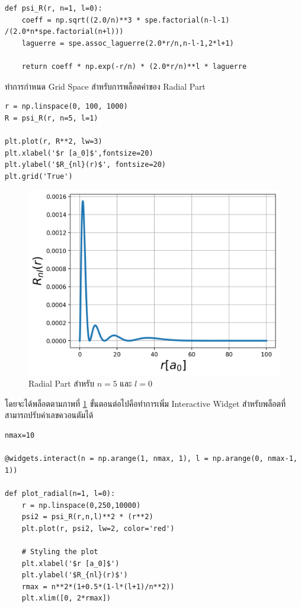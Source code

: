 \begin{lstlisting}[style=MyPython]
def psi_R(r, n=1, l=0):
    coeff = np.sqrt((2.0/n)**3 * spe.factorial(n-l-1) /(2.0*n*spe.factorial(n+l)))
    laguerre = spe.assoc_laguerre(2.0*r/n,n-l-1,2*l+1)
    
    return coeff * np.exp(-r/n) * (2.0*r/n)**l * laguerre
\end{lstlisting}

\noindent ทำการกำหนด Grid Space สำหรับการพล็อตค่าของ Radial Part

\begin{lstlisting}[style=MyPython]
r = np.linspace(0, 100, 1000)
R = psi_R(r, n=5, l=1)

plt.plot(r, R**2, lw=3)
plt.xlabel('$r [a_0]$',fontsize=20)
plt.ylabel('$R_{nl}(r)$', fontsize=20)
plt.grid('True')
\end{lstlisting}

\begin{figure}[H]
    \centering
    \includegraphics[width=0.8\linewidth]{fig/wfn_hydro_radial.png}
    \caption{Radial Part สำหรับ $n = 5$ และ $l = 0$}
    \label{fig:wfn_hydro_radial}
\end{figure}

\noindent โดยจะได้พล็อตตามภาพที่ \ref{fig:wfn_hydro_radial} ขั้นตอนต่อไปคือทำการเพิ่ม Interactive Widget สำหรับพล็อตที่สามารถปรับค่าเลขควอนตัมได้

\begin{lstlisting}[style=MyPython]
nmax=10

@widgets.interact(n = np.arange(1, nmax, 1), l = np.arange(0, nmax-1, 1))

def plot_radial(n=1, l=0):
    r = np.linspace(0,250,10000)
    psi2 = psi_R(r,n,l)**2 * (r**2)
    plt.plot(r, psi2, lw=2, color='red')

    # Styling the plot
    plt.xlabel('$r [a_0]$')
    plt.ylabel('$R_{nl}(r)$')
    rmax = n**2*(1+0.5*(1-l*(l+1)/n**2))
    plt.xlim([0, 2*rmax])
\end{lstlisting}

